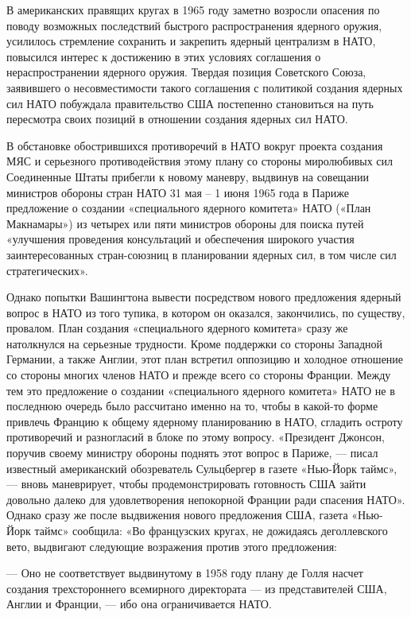 \documentclass[12pt, a4paper, openany]{book}
\begin{document}
		В американских правящих кругах в 1965 году заметно возросли опасения по поводу возможных последствий быстрого распространения ядерного оружия, усилилось стремление сохранить и закрепить ядерный централизм в НАТО, повысился интерес к достижению в этих условиях соглашения о нераспространении ядерного оружия. Твердая позиция Советского Союза, заявившего о несовместимости такого соглашения с политикой создания ядерных сил НАТО побуждала правительство США постепенно становиться на путь пересмотра своих позиций в отношении создания ядерных сил НАТО.
		
		В обстановке обострившихся противоречий в НАТО вокруг проекта создания МЯС и серьезного противодействия этому плану со стороны миролюбивых сил Соединенные Штаты прибегли к новому маневру, выдвинув на совещании министров обороны стран НАТО 31 мая – 1 июня 1965 года в Париже предложение о создании «специального ядерного комитета» НАТО («План Макнамары») из четырех или пяти министров обороны для поиска путей «улучшения проведения консультаций и обеспечения широкого участия заинтересованных стран-союзниц в планировании ядерных сил, в том числе сил стратегических».
		
		Однако попытки Вашингтона вывести посредством нового предложения ядерный вопрос в НАТО из того тупика, в котором он оказался, закончились, по существу, провалом. План создания «специального ядерного комитета» сразу же натолкнулся на серьезные трудности. Кроме поддержки со стороны Западной Германии, а также Англии, этот план встретил оппозицию и холодное отношение со стороны многих членов НАТО и прежде всего со стороны Франции. Между тем это предложение о создании «специального ядерного комитета» НАТО не в последнюю очередь было рассчитано именно на то, чтобы в какой-то форме привлечь Францию к общему ядерному планированию в НАТО, сгладить остроту противоречий и разногласий в блоке по этому вопросу. «Президент Джонсон, поручив своему министру обороны поднять этот вопрос в Париже, — писал известный американский обозреватель Сульцбергер в газете «Нью-Йорк таймс», — вновь маневрирует, чтобы продемонстрировать готовность США зайти довольно далеко для удовлетворения непокорной Франции ради спасения НАТО». Однако сразу же после выдвижения нового предложения США, газета «Нью-Йорк таймс» сообщила: «Во французских кругах, не дожидаясь деголлевского вето, выдвигают следующие возражения против этого предложения:
		
		— Оно не соответствует выдвинутому в 1958 году плану де Голля насчет создания трехстороннего всемирного директората — из представителей США, Англии и Франции, — ибо она ограничивается НАТО.
		
\end{document}
